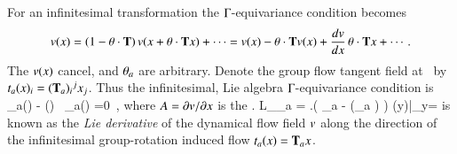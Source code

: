 % 
For an infinitesimal transformation 
the $\Gamma$-equivariance condition 
becomes
\[
v(x) =(1-{\bf \theta} \cdot \mathbf{T}) \, v(x+{\bf \theta} \cdot \mathbf{T} x) + \cdots
       =v(x)- {\bf \theta} \cdot \mathbf{T} v(x)
             + \frac{dv}{dx} \,{\bf \theta} \cdot \mathbf{T} x + \cdots
\,.
\]
The $v(x)$ cancel, and ${\bf \theta}_a$ are arbitrary. Denote
the group flow tangent field at \ssp\ by
$t_a(x)_{i}= (\mathbf{T}_a){}_{i}{}^j x_j$. Thus the
infinitesimal, Lie algebra $\Gamma$-equivariance condition is
\beq
  \groupTan_a(\vel)  - \Mvar(\ssp) \, \groupTan_a(\ssp) =0
  \,,
where $A = {\partial v}/{\partial x}$ is the \stabmat. 
\beq
{\cal L}_{\groupTan_a} \vel =
\left.\left(
  \Lg_a - (\Lg_a \ssp)
 \right) \vel(y)\right|_{y=\ssp}
is known as the {\em Lie derivative} of the dynamical flow
field $v$ along the direction of the infinitesimal
group-rotation induced flow $t_a(x)= \mathbf{T}_a x$.

% 

